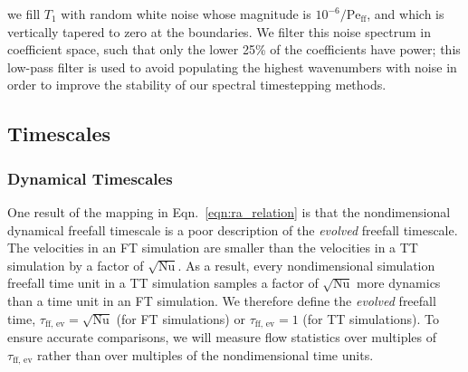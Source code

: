 \documentclass[aps, pre, onecolumn, nofootinbib, notitlepage, groupedaddress, amsfonts, amssymb, amsmath, longbibliography, superscriptaddress]{revtex4-1}
\newcommand{\Peff}{\ensuremath{\text{Pe}_{\text{ff}}}}
\newcommand{\ea}[1]{{\color{red} #1}}
\begin{document}
we fill $T_1$ with random white noise whose magnitude is $10^{-6}/\Peff$, and which is vertically tapered to zero at the boundaries.
We filter this noise spectrum in coefficient space, such that only the lower 25\% of the coefficients have power; this low-pass filter is used to avoid populating the highest wavenumbers with noise in order to improve the stability of our spectral timestepping methods.

\ea{
\subsection{Timescales}
\label{sec:timescales}
}
\subsubsection{Dynamical Timescales}
One \ea{result of the mapping in Eqn.~\ref{eqn:ra_relation}} is that the nondimensional dynamical freefall timescale is a poor description of the \emph{evolved} freefall timescale.
The velocities in an FT simulation are smaller than the velocities in a TT simulation by a factor of $\sqrt{\text{Nu}}$.
As a result, every nondimensional simulation freefall time unit in a TT simulation samples a factor of $\sqrt{\text{Nu}}$ more dynamics than a time unit in an FT simulation.
\ea{We therefore define the \emph{evolved} freefall time, $\tau_{\text{ff, ev}} = \sqrt{\text{Nu}}$ (for FT simulations) or $\tau_{\text{ff, ev}} = 1$ (for TT simulations).
To ensure accurate comparisons, we will measure flow statistics over multiples of $\tau_{\text{ff, ev}}$ rather than over multiples of the nondimensional time units.}
\end{document}
